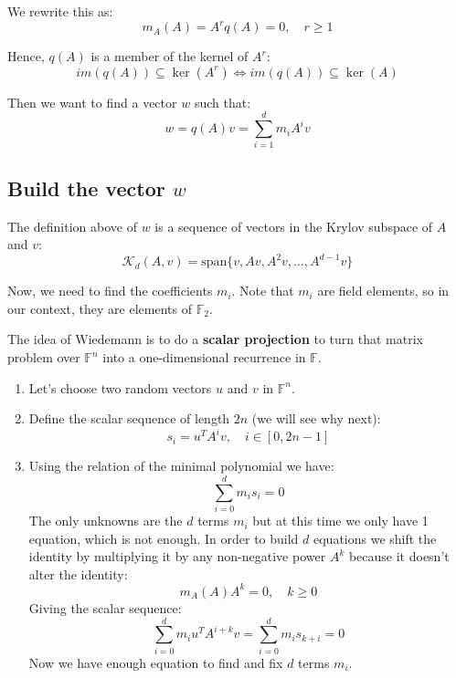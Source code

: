 \documentclass[a4paper, 11pt]{article}
\begin{document}
We rewrite this as:
\begin{equation}
    m_A(A) = A^r q(A) = 0, \quad r \geq 1
\end{equation}

Hence, $q(A)$ is a member of the kernel of $A^r$:
\begin{equation}
    im(q(A)) \subseteq \ker(A^r) \iff im(q(A)) \subseteq \ker(A)
\end{equation}

Then we want to find a vector $w$ such that:
\begin{equation}
    w = q(A)v = \sum^d_{i=1} m_i A^i v
\end{equation}

\subsection{Build the vector $w$}

The definition above of $w$ is a sequence of vectors in the Krylov subspace of $A$ and $v$:
\begin{equation}
    \mathcal{K}_d(A,v) = \mathrm{span}\{v, Av, A^2v, \dots, A^{d-1}v\}
\end{equation}

Now, we need to find the coefficients $m_i$. Note that $m_i$ are field elements, so in our context, they are elements of $\mathbb{F}_2$.

The idea of Wiedemann is to do a \textbf{scalar projection} to turn that matrix problem over $\mathbb{F}^n$ into a one-dimensional recurrence in $\mathbb{F}$.

\begin{enumerate}
    \item Let's choose two random vectors $u$ and $v$ in $\mathbb{F}^{n}$.
    \item Define the scalar sequence of length $2n$ (we will see why next): $$s_i = u^TA^iv, \quad i \in [0, 2n-1]$$
    \item Using the relation of the minimal polynomial we have:
    $$\sum^d_{i=0} m_i s_{i} = 0$$
    The only unknowns are the $d$ terms $m_i$ but at this time we only have 1 equation, which is not enough. In order to build $d$ equations we shift the identity by multiplying it by any non-negative power $A^k$ because it doesn't alter the identity:
    $$m_A(A)A^k=0, \quad k \ge 0$$
    Giving the scalar sequence:
    $$\sum^d_{i=0} m_i u^T A^{i+k}v = \sum^d_{i=0} m_i s_{k+i} = 0$$
    Now we have enough equation to find and fix $d$ terms $m_i$.
\end{enumerate}
\end{document}
